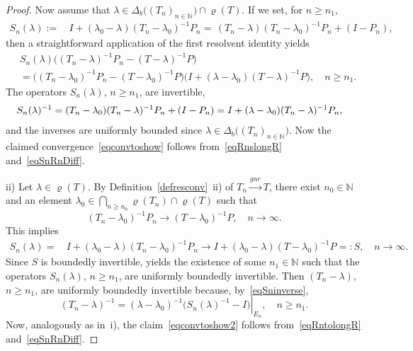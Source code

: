 \documentclass[a4paper,reqno]{amsart}
\begin{document}
{\begin{proof}
Now assume that $\lambda\in\Delta_b\big((T_n)_{n\in{\mathbb{N}}}\big)\cap\varrho(T)$.
If we set, for $n\geq n_1$,
\begin{align*} S_n(\lambda):=&\,I+(\lambda_0-\lambda)(T_n-\lambda_0)^{-1}P_n =\,(T_n-\lambda)(T_n-\lambda_0)^{-1}P_n+(I-P_n),\end{align*}
then a straightforward application of the first resolvent identity yields
\begin{equation} \begin{aligned}
&S_n(\lambda)\big((T_n-\lambda)^{-1}P_n-(T-\lambda)^{-1}P\big)\\
&=\big((T_n-\lambda_0)^{-1}P_n-(T-\lambda_0)^{-1}P\big)\big(I+(\lambda-\lambda_0)(T-\lambda)^{-1}P\big), \quad n\geq n_1. 
\end{aligned}\label{eqSnRnDiff}
\end{equation}
The operators $S_n(\lambda)$, $n\geq n_1$, are invertible,
\begin{equation} \begin{aligned} \hspace{-1.5mm}S_n(\lambda)^{-1}&=(T_n-\lambda_0)(T_n-\lambda)^{-1}P_n+(I-P_n)=I+(\lambda-\lambda_0)(T_n-\lambda)^{-1}P_n,\hspace{-2mm}\end{aligned}\label{eqSninverse}\end{equation}
and the inverses are uniformly bounded  since $\lambda\in\Delta_b\big((T_n)_{n\in{\mathbb{N}}}\big)$.
Now the claimed convergence~\eqref{eqconvtoshow} follows from~\eqref{eqRnslongR} and~\eqref{eqSnRnDiff}.

ii)
Let $\lambda\in\varrho(T)$.
By Definition~\ref{defresconv}~ii) of $T_n{\stackrel{gnr}{\rightarrow}} T$, there exist $n_0\in{\mathbb{N}}$  and an element 
$\lambda_0\in\underset{n\geq n_0}{\bigcap}\varrho(T_n)\cap\varrho(T)$ such that \vspace{-2mm}
\begin{equation} (T_n-\lambda_0)^{-1}P_n{\longrightarrow} (T-\lambda_0)^{-1}P, \quad n\to\infty.\label{eqRntolongR}\end{equation}
This implies 
\begin{align*} S_n(\lambda)=&\, I+(\lambda_0-\lambda)(T_n-\lambda_0)^{-1}P_n {\longrightarrow} I+(\lambda_0-\lambda)(T-\lambda_0)^{-1}P=:S, \quad n\to\infty.\end{align*}
Since $S$ is boundedly invertible, \cite[Theorem~IV.1.16]{kato} yields the existence of some $n_1\in{\mathbb{N}}$ 
such that the operators $S_n(\lambda)$, $n\geq n_1$, are uniformly boundedly invertible.
Then $(T_n-\lambda)$, $n\geq n_1$, are uniformly boundedly invertible because, by~\eqref{eqSninverse}, $$(T_n-\lambda)^{-1}=(\lambda-\lambda_0)^{-1}\left.\big(S_n(\lambda)^{-1}-I\big)\right|_{E_n}, \quad n\geq n_1.$$
Now, analogously as in~i), the claim~\eqref{eqconvtoshow2} follows from~\eqref{eqRntolongR} and~\eqref{eqSnRnDiff}.
\end{proof}

}
\end{document}
